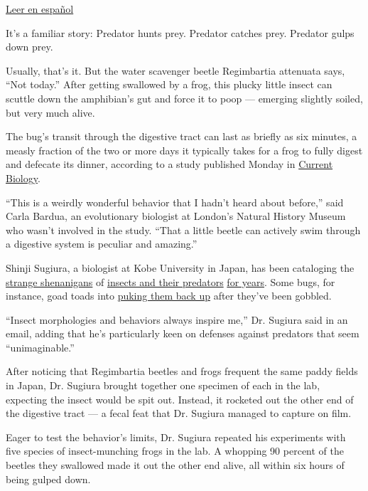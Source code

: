 \href{https://www.nytimes.com/es/2020/08/04/espanol/ciencia-y-tecnologia/escarabajo-excremento-rana.html}{Leer
en español}

It's a familiar story: Predator hunts prey. Predator catches prey.
Predator gulps down prey.

Usually, that's it. But the water scavenger beetle Regimbartia attenuata
says, ``Not today.'' After getting swallowed by a frog, this plucky
little insect can scuttle down the amphibian's gut and force it to poop
--- emerging slightly soiled, but very much alive.

The bug's transit through the digestive tract can last as briefly as six
minutes, a measly fraction of the two or more days it typically takes
for a frog to fully digest and defecate its dinner, according to a study
published Monday in
\href{http://dx.doi.org/10.1016/j.cub.2020.06.026}{Current Biology}.

``This is a weirdly wonderful behavior that I hadn't heard about
before,'' said Carla Bardua, an evolutionary biologist at London's
Natural History Museum who wasn't involved in the study. ``That a little
beetle can actively swim through a digestive system is peculiar and
amazing.''

Shinji Sugiura, a biologist at Kobe University in Japan, has been
cataloging the
\href{https://royalsocietypublishing.org/doi/10.1098/rsbl.2017.0647}{strange
shenanigans} of \href{https://peerj.com/articles/5942/}{insects and
their predators}
\href{https://onlinelibrary.wiley.com/doi/abs/10.1111/ens.12423}{for
years}. Some bugs, for instance, goad toads into
\href{https://www.nytimes.com/2018/02/06/science/bombardier-beetle-toad-vomit.html}{puking
them back up} after they've been gobbled.

``Insect morphologies and behaviors always inspire me,'' Dr. Sugiura
said in an email, adding that he's particularly keen on defenses against
predators that seem ``unimaginable.''

After noticing that Regimbartia beetles and frogs frequent the same
paddy fields in Japan, Dr. Sugiura brought together one specimen of each
in the lab, expecting the insect would be spit out. Instead, it rocketed
out the other end of the digestive tract --- a fecal feat that Dr.
Sugiura managed to capture on film.

Eager to test the behavior's limits, Dr. Sugiura repeated his
experiments with five species of insect-munching frogs in the lab. A
whopping 90 percent of the beetles they swallowed made it out the other
end alive, all within six hours of being gulped down.

